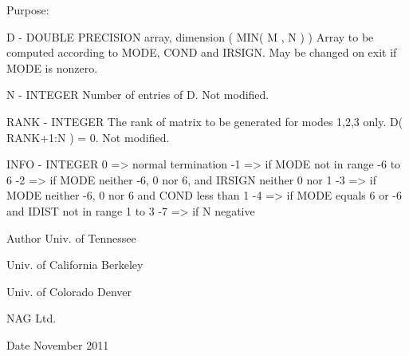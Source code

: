 \begin{DoxyParagraph}{Purpose\+: }
\begin{DoxyVerb}
  D      - DOUBLE PRECISION array, dimension ( MIN( M , N ) )
           Array to be computed according to MODE, COND and IRSIGN.
           May be changed on exit if MODE is nonzero.

  N      - INTEGER
           Number of entries of D. Not modified.

  RANK   - INTEGER
           The rank of matrix to be generated for modes 1,2,3 only.
           D( RANK+1:N ) = 0.
           Not modified.

  INFO   - INTEGER
            0  => normal termination
           -1  => if MODE not in range -6 to 6
           -2  => if MODE neither -6, 0 nor 6, and
                  IRSIGN neither 0 nor 1
           -3  => if MODE neither -6, 0 nor 6 and COND less than 1
           -4  => if MODE equals 6 or -6 and IDIST not in range 1 to 3
           -7  => if N negative\end{DoxyVerb}
 
\end{DoxyParagraph}
\begin{DoxyAuthor}{Author}
Univ. of Tennessee 

Univ. of California Berkeley 

Univ. of Colorado Denver 

N\+A\+G Ltd. 
\end{DoxyAuthor}
\begin{DoxyDate}{Date}
November 2011 
\end{DoxyDate}
\hypertarget{group__double__matgen_gabfc94c3c7b833edf3e9ed1f3afc1459d}{}
